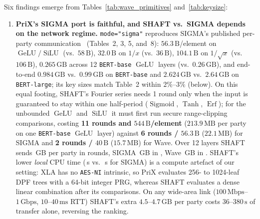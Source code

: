 \documentclass[11pt]{article}
\begin{document}
Six findings emerge from Tables~\ref{tab:wave_primitives} and~\ref{tab:keysize}:
\begin{enumerate}
    \item \textbf{PriX's SIGMA port is faithful, and SHAFT vs.\ SIGMA depends on the network regime.} \texttt{mode="sigma"} reproduces SIGMA's published per-party communication~\cite{gupta2024sigma} (Tables~2, 3, 5, and~8): $56.3\,\text{B}$/element on $\operatorname{GeLU}/\operatorname{SiLU}$ (vs.\ $58\,\text{B}$), $32.0\,\text{B}$ on $1/x$ (vs.\ $36\,\text{B}$), $104.1\,\text{B}$ on $1/\sqrt{x}$ (vs.\ $106\,\text{B}$), $0.265\,\text{GB}$ across 12 \texttt{BERT-base} $\operatorname{GeLU}$ layers (vs.\ $0.26\,\text{GB}$), and end-to-end $0.984\,\text{GB}$ vs.\ $0.99\,\text{GB}$ on \texttt{BERT-base} and $2.624\,\text{GB}$ vs.\ $2.64\,\text{GB}$ on \texttt{BERT-large}; its key sizes match Table~2 within $2\%$--$3\%$ (below). On this equal footing, SHAFT's Fourier series needs 1 round only when the input is guaranteed to stay within one half-period ($\operatorname{Sigmoid}$, $\operatorname{Tanh}$, $\operatorname{Erf}$); for the unbounded $\operatorname{GeLU}$ and $\operatorname{SiLU}$ it must first run secure range-clipping comparisons, costing \textbf{11 rounds and $544\,\text{B}$/element} ($213.9\,\text{MB}$ per party on one \texttt{BERT-base} $\operatorname{GeLU}$ layer) against \textbf{6 rounds / $56.3\,\text{B}$} ($22.1\,\text{MB}$) for SIGMA and \textbf{2 rounds / $40\,\text{B}$} ($15.7\,\text{MB}$) for Wave. Over 12 layers SHAFT sends \BertBaseShaftOnlineGB\,GB per party in \BertBaseShaftRounds{} rounds, SIGMA \BertBaseSigmaOnlineGB\,GB in \BertBaseSigmaRounds, Wave \BertBaseWaveDetOnlineGB\,GB in \BertBaseWaveDetRounds. SHAFT's lower \emph{local} CPU time (\BertBaseShaftTimeS\,s vs.\ \BertBaseSigmaTimeS\,s for SIGMA) is a compute artefact of our setting: XLA has no \texttt{AES-NI} intrinsic, so PriX evaluates 256- to 1024-leaf DPF trees with a 64-bit integer PRG, whereas SHAFT evaluates a dense linear combination after its comparisons. On any wide-area link ($100\,\text{Mbps}$--$1\,\text{Gbps}$, $10$--$40\,\text{ms}$ RTT) SHAFT's extra $4.5$--$4.7\,\text{GB}$ per party costs $36$--$380\,\text{s}$ of transfer alone, reversing the ranking.

\end{enumerate}
\end{document}
